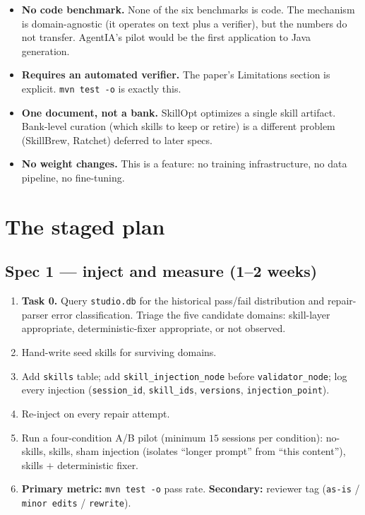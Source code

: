 \documentclass[11pt,a4paper]{article}
\begin{document}
\begin{itemize}[leftmargin=1.4em]
  \item \textbf{No code benchmark.} None of the six benchmarks is code.
  The mechanism is domain-agnostic (it operates on text plus a
  verifier), but the numbers do not transfer. AgentIA's pilot would be
  the first application to Java generation.
  \item \textbf{Requires an automated verifier.} The paper's Limitations
  section is explicit. \texttt{mvn test -o} is exactly this.
  \item \textbf{One document, not a bank.} SkillOpt optimizes a single
  skill artifact. Bank-level curation (which skills to keep or retire)
  is a different problem (SkillBrew, Ratchet) deferred to later specs.
  \item \textbf{No weight changes.} This is a feature: no training
  infrastructure, no data pipeline, no fine-tuning.
\end{itemize}

\section{The staged plan}

\subsection{Spec 1 --- inject and measure (1--2 weeks)}

\begin{enumerate}[leftmargin=1.4em]
  \item \textbf{Task 0.} Query \texttt{studio.db} for the historical
  pass/fail distribution and repair-parser error classification. Triage
  the five candidate domains: skill-layer appropriate,
  deterministic-fixer appropriate, or not observed.
  \item Hand-write seed skills for surviving domains.
  \item Add \texttt{skills} table; add \texttt{skill\_injection\_node}
  before \texttt{validator\_node}; log every injection
  (\texttt{session\_id}, \texttt{skill\_ids}, \texttt{versions},
  \texttt{injection\_point}).
  \item Re-inject on every repair attempt.
  \item Run a four-condition A/B pilot (minimum \(15\) sessions per
  condition): no-skills, skills, sham injection (isolates ``longer
  prompt'' from ``this content''), skills \(+\) deterministic fixer.
  \item \textbf{Primary metric:} \texttt{mvn test -o} pass rate.
  \textbf{Secondary:} reviewer tag
  (\texttt{as-is} / \texttt{minor edits} / \texttt{rewrite}).
\end{enumerate}
\end{document}
